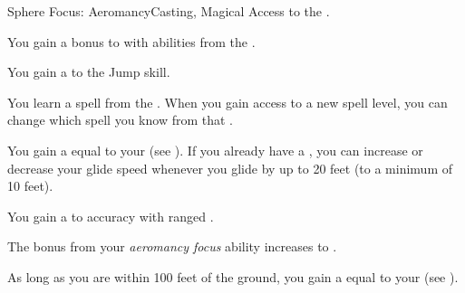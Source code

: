     \begin{feat}{Sphere Focus: Aeromancy}{Casting, Magical}
        \featpre Access to the  .

         You gain a  bonus to  with abilities from the  .

         You gain a   to the Jump skill.

         You learn a spell from the  .
        When you gain access to a new spell level, you can change which spell you know from that .

         You gain a  equal to your  (see ).
        If you already have a , you can increase or decrease your glide speed whenever you glide by up to 20 feet (to a minimum of 10 feet).

         You gain a   to accuracy with ranged .

         The bonus from your \textit{aeromancy focus} ability increases to .

         As long as you are within 100 feet of the ground, you gain a  equal to your  (see ).
    \end{feat}

